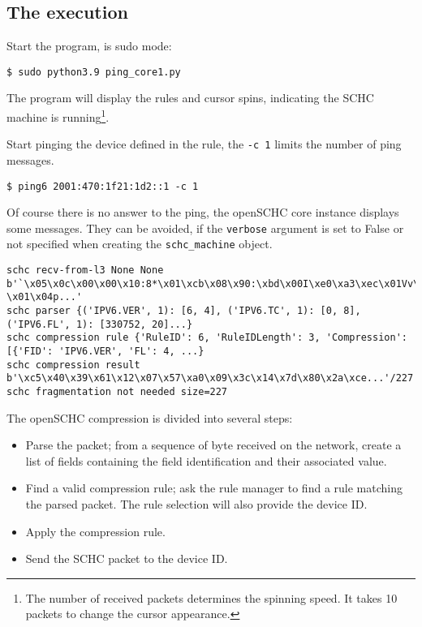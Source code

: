 \subsection{The execution}

Start the program, is sudo mode:

\begin{lstlisting}
$ sudo python3.9 ping_core1.py 
\end{lstlisting}

The program will display the rules and cursor spins, indicating the SCHC machine is running\footnote{The number of received packets determines the spinning speed. It takes 10 packets to change the cursor appearance.}. 

Start pinging the device defined in the rule, the \texttt{-c 1} limits the number of ping messages. 

\begin{lstlisting}
$ ping6 2001:470:1f21:1d2::1 -c 1
\end{lstlisting}

Of course there is no answer to the ping, the openSCHC core instance displays some messages. They can be avoided, if the \texttt{verbose} argument is set to False or not specified when creating the \texttt{schc\_machine} object. 

\begin{lstlisting}[basicstyle=\ttfamily\tiny]
schc recv-from-l3 None None b'`\x05\x0c\x00\x00\x10:8*\x01\xcb\x08\x90:\xbd\x00I\xe0\xa3\xec\x01Vv\x9c \x01\x04p...'
schc parser {('IPV6.VER', 1): [6, 4], ('IPV6.TC', 1): [0, 8], ('IPV6.FL', 1): [330752, 20]...} 
schc compression rule {'RuleID': 6, 'RuleIDLength': 3, 'Compression': [{'FID': 'IPV6.VER', 'FL': 4, ...}
schc compression result b'\xc5\x40\x39\x61\x12\x07\x57\xa0\x09\x3c\x14\x7d\x80\x2a\xce...'/227
schc fragmentation not needed size=227
\end{lstlisting}
 
The openSCHC compression is divided into several steps:
\begin{itemize}
\item Parse the packet; from a sequence of byte received on the network, create a list of fields containing the field identification and their associated value.
\item Find a valid compression rule; ask the rule manager to find a rule matching the parsed packet. The rule selection will also provide the device ID.
\item Apply the compression rule.
\item Send the SCHC packet to the device ID.
\end{itemize}

